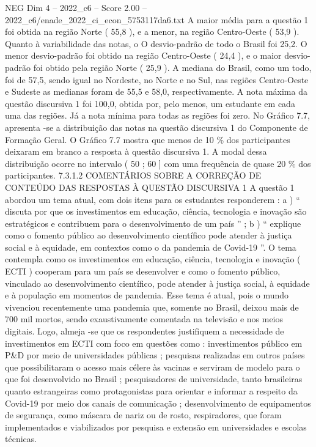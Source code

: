 \begin{textsample}{NEG Dim 4 – 2022\_c6 – Score 2.00 – 2022\_c6/enade\_2022\_ci\_econ\_5753117da6.txt}
A maior média para a questão 1 foi obtida na região Norte ( 55,8 ), e a menor, na região Centro-Oeste ( 53,9 ).
Quanto à variabilidade das notas, o O desvio-padrão de todo o Brasil foi 25,2.
O menor desvio-padrão foi obtido na região Centro-Oeste ( 24,4 ), e o maior desvio-padrão foi obtido pela região Norte ( 25,9 ).
A mediana do Brasil, como um todo, foi de 57,5, sendo igual no Nordeste, no Norte e no Sul, nas regiões Centro-Oeste e Sudeste as medianas foram de 55,5 e 58,0, respectivamente.
A nota máxima da questão discursiva 1 foi 100,0, obtida por, pelo menos, um estudante em cada uma das regiões.
Já a nota mínima para todas as regiões foi zero.
No Gráfico 7.7, apresenta -se a distribuição das notas na questão discursiva 1 do Componente de Formação Geral.
O Gráfico 7.7 mostra que menos de 10 \% dos participantes deixaram em branco a resposta à questão discursiva 1.
A modal dessa distribuição ocorre no intervalo ( 50 ; 60 ] com uma frequência de quase 20 \% dos participantes. 7.3.1.2 COMENTÁRIOS SOBRE A CORREÇÃO DE CONTEÚDO DAS RESPOSTAS À QUESTÃO DISCURSIVA 1 A questão 1 abordou um tema atual, com dois itens para os estudantes responderem : a ) “ discuta por que os investimentos em educação, ciência, tecnologia e inovação são estratégicos e contribuem para o desenvolvimento de um país ” ; b ) “ explique como o fomento público ao desenvolvimento científico pode atender à justiça social e à equidade, em contextos como o da pandemia de Covid-19 ”.
O tema contempla como os investimentos em educação, ciência, tecnologia e inovação ( ECTI ) cooperam para um país se desenvolver e como o fomento público, vinculado ao desenvolvimento científico, pode atender à justiça social, à equidade e à população em momentos de pandemia.
Esse tema é atual, pois o mundo vivenciou recentemente uma pandemia que, somente no Brasil, deixou mais de 700 mil mortos, sendo exaustivamente comentada na televisão e nos meios digitais.
Logo, almeja -se que os respondentes justifiquem a necessidade de investimentos em ECTI com foco em questões como : investimentos público em P\&D por meio de universidades públicas ; pesquisas realizadas em outros países que possibilitaram o acesso mais célere às vacinas e serviram de modelo para o que foi desenvolvido no Brasil ; pesquisadores de universidade, tanto brasileiras quanto estrangeiras como protagonistas para orientar e informar a respeito da Covid-19 por meio dos canais de comunicação ; desenvolvimento de equipamentos de segurança, como máscara de nariz ou de rosto, respiradores, que foram implementados e viabilizados por pesquisa e extensão em universidades e escolas técnicas.

\end{textsample}
